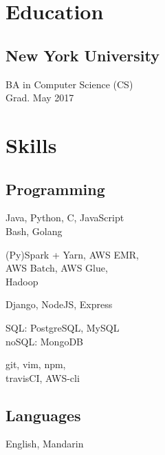 \documentclass[]{hieudo-build}
\begin{document}
\begin{minipage}[t]{0.34\textwidth} 

\section{Education} 

\subsection{New York University}
BA in Computer Science (CS) \\
Grad. May 2017 \\
\sectionsep


\section{Skills}
\subsection{Programming}
Java, Python, C, JavaScript\\
Bash, Golang
\newline

(Py)Spark + Yarn, AWS EMR, \\
AWS Batch, AWS Glue, \\
Hadoop
\newline

Django, NodeJS, Express
\newline

SQL: PostgreSQL, MySQL\\
noSQL: MongoDB
\newline

git, vim, npm,\\
travisCI, AWS-cli
\newline

\sectionsep

\subsection{Languages}
 English, Mandarin\\
\sectionsep


\end{minipage}
\end{document}
